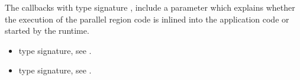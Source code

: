 \descr
The callbacks with type signature , 
include a parameter  which explains whether the execution of the parallel
region code is inlined into the application code or started by the runtime.


\crossreferences
\begin{itemize}
\item {} type signature, see 
.
\item {} type signature, see 
.
\end{itemize}





